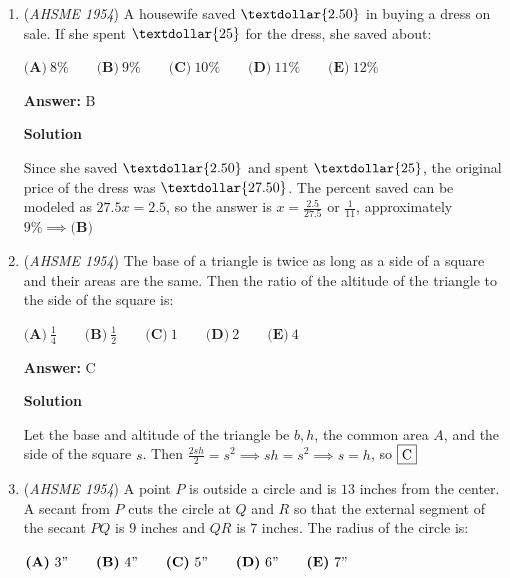 \begin{enumerate}
\textbf{Solution}

$\frac{1}{16}a^0+\left (\frac{1}{16a} \right )^0- \left (64^{-\frac{1}{2}} \right )- (-32)^{-\frac{4}{5}}\implies \frac{1}{16}+1-\frac{1}{8}-((-32)^4)^\frac{1}{5}\implies 1-\frac{1}{16}-\frac{1}{16}$$\implies1-\frac{1}{8}\implies\boxed{\textbf{(D) }\frac{7}{8}}$.

 


	\item (\textit{AHSME 1954}) A housewife saved $\textdollar{2.50}$ in buying a dress on sale. If she spent $\textdollar{25}$ for the dress, she saved about: 


 $\textbf{(A)}\ 8 \% \qquad \textbf{(B)}\ 9 \% \qquad \textbf{(C)}\ 10 \% \qquad \textbf{(D)}\ 11 \% \qquad \textbf{(E)}\ 12\%$

 \textbf{Answer: }B



\textbf{Solution}

Since she saved $\textdollar{2.50}$ and spent $\textdollar{25}$, the original price of the dress was $\textdollar{27.50}$. The percent saved can be modeled as $27.5x=2.5$, so the answer is $x=\frac{2.5}{27.5}$ or $\frac{1}{11}$, approximately $9\% \implies \textbf{(B)}$



	\item (\textit{AHSME 1954}) The base of a triangle is twice as long as a side of a square and their areas are the same. 
Then the ratio of the altitude of the triangle to the side of the square is: 


 $\textbf{(A)}\ \frac{1}{4} \qquad \textbf{(B)}\ \frac{1}{2} \qquad \textbf{(C)}\ 1 \qquad \textbf{(D)}\ 2 \qquad \textbf{(E)}\ 4$

 \textbf{Answer: }C



\textbf{Solution}

Let the base and altitude of the triangle be $b, h$, the common area $A$, and the side of the square $s$. Then $\frac{2sh}{2}=s^2\implies sh=s^2\implies s=h$, so $\fbox{C}$



	\item (\textit{AHSME 1954}) A point $P$ is outside a circle and is $13$ inches from the center. A secant from $P$ cuts the circle at $Q$ and $R$ 
so that the external segment of the secant $PQ$ is $9$ inches and $QR$ is $7$ inches. The radius of the circle is: 


 $\textbf{(A)}\ 3" \qquad \textbf{(B)}\ 4" \qquad \textbf{(C)}\ 5" \qquad \textbf{(D)}\ 6"\qquad\textbf{(E)}\ 7"$


\end{enumerate}
